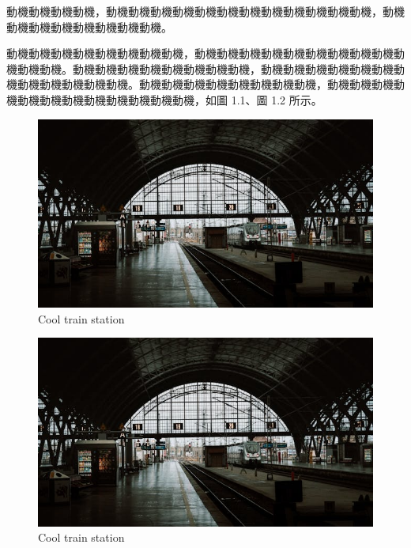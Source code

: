 \begin{ZhChapter}
動機動機動機動機，動機動機動機動機動機動機動機動機動機動機動機動機，動機動機動機動機動機動機動機動機。

動機動機動機動機動機動機動機動機，動機動機動機動機動機動機動機動機動機動機動機動機。動機動機動機動機動機動機動機動機，動機動機動機動機動機動機動機動機動機動機動機動機。動機動機動機動機動機動機動機動機，動機動機動機動機動機動機動機動機動機動機動機動機，如圖 1.1、圖 1.2 所示。

\begin{figure}[htbp]
    \centering
    \includegraphics[width = 1\textwidth]{image/image.jpeg}
    \caption{Cool train station}
    \label{fig: image}
\end{figure}

\begin{figure}[htbp]
    \centering
    \includegraphics[width = 1\textwidth]{image/image.jpeg}
    \caption{Cool train station}
    \label{fig: image}
\end{figure}


\end{ZhChapter}
